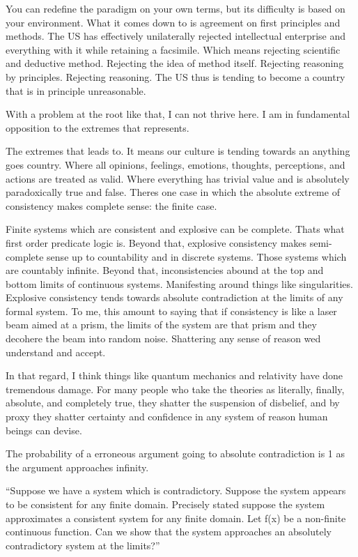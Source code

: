 You can redefine the paradigm on your own terms, but its difficulty is
based on your environment. What it comes down to is agreement on first
principles and methods. The US has effectively unilaterally rejected
intellectual enterprise and everything with it while retaining a
facsimile. Which means rejecting scientific and deductive method.
Rejecting the idea of method itself. Rejecting reasoning by principles.
Rejecting reasoning. The US thus is tending to become a country that is
in principle unreasonable.

With a problem at the root like that, I can not thrive here. I am in
fundamental opposition to the extremes that represents.

The extremes that leads to. It means our culture is tending towards an
anything goes country. Where all opinions, feelings, emotions, thoughts,
perceptions, and actions are treated as valid. Where everything has
trivial value and is absolutely paradoxically true and false.
There\textquotesingle s one case in which the absolute extreme of
consistency makes complete sense: the finite case.

Finite systems which are consistent and explosive can be complete.
That\textquotesingle s what first order predicate logic is. Beyond that,
explosive consistency makes semi-complete sense up to countability and
in discrete systems. Those systems which are countably infinite. Beyond
that, inconsistencies abound at the top and bottom limits of continuous
systems. Manifesting around things like singularities. Explosive
consistency tends towards absolute contradiction at the limits of any
formal system. To me, this amount to saying that if consistency is like
a laser beam aimed at a prism, the limits of the system are that prism
and they decohere the beam into random noise. Shattering any sense of
reason we\textquotesingle d understand and accept.

In that regard, I think things like quantum mechanics and relativity
have done tremendous damage. For many people who take the theories as
literally, finally, absolute, and completely true, they shatter the
suspension of disbelief, and by proxy they shatter certainty and
confidence in any system of reason human beings can devise.

The probability of a erroneous argument going to absolute contradiction
is 1 as the argument approaches infinity.

``Suppose we have a system which is contradictory. Suppose the system
appears to be consistent for any finite domain. Precisely stated suppose
the system approximates a consistent system for any finite domain. Let
f(x) be a non-finite continuous function. Can we show that the system
approaches an absolutely contradictory system at the limits?''


